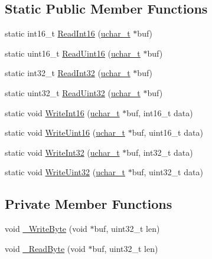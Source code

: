 \subsection*{Static Public Member Functions}
\begin{DoxyCompactItemize}
\item 
static int16\+\_\+t \hyperlink{class_c_byte_stream_a945036d647a836760116bb5797541c5e}{Read\+Int16} (\hyperlink{base_2ostype_8h_a124ea0f8f4a23a0a286b5582137f0b8d}{uchar\+\_\+t} $\ast$buf)
\item 
static uint16\+\_\+t \hyperlink{class_c_byte_stream_a33438bfced8557d24c34b48bb39ad23d}{Read\+Uint16} (\hyperlink{base_2ostype_8h_a124ea0f8f4a23a0a286b5582137f0b8d}{uchar\+\_\+t} $\ast$buf)
\item 
static int32\+\_\+t \hyperlink{class_c_byte_stream_a186365273e46ccaf8c99bd9a570eaa4a}{Read\+Int32} (\hyperlink{base_2ostype_8h_a124ea0f8f4a23a0a286b5582137f0b8d}{uchar\+\_\+t} $\ast$buf)
\item 
static uint32\+\_\+t \hyperlink{class_c_byte_stream_af3f488561191aafe06530146d980d544}{Read\+Uint32} (\hyperlink{base_2ostype_8h_a124ea0f8f4a23a0a286b5582137f0b8d}{uchar\+\_\+t} $\ast$buf)
\item 
static void \hyperlink{class_c_byte_stream_aa72937a9fc75a7ad5d396b14f7f1b5e7}{Write\+Int16} (\hyperlink{base_2ostype_8h_a124ea0f8f4a23a0a286b5582137f0b8d}{uchar\+\_\+t} $\ast$buf, int16\+\_\+t data)
\item 
static void \hyperlink{class_c_byte_stream_a8168cdc0018abb0457fb6177d277471b}{Write\+Uint16} (\hyperlink{base_2ostype_8h_a124ea0f8f4a23a0a286b5582137f0b8d}{uchar\+\_\+t} $\ast$buf, uint16\+\_\+t data)
\item 
static void \hyperlink{class_c_byte_stream_a5e962ee0e33cc661c68ac26076f96e62}{Write\+Int32} (\hyperlink{base_2ostype_8h_a124ea0f8f4a23a0a286b5582137f0b8d}{uchar\+\_\+t} $\ast$buf, int32\+\_\+t data)
\item 
static void \hyperlink{class_c_byte_stream_acfc135062432fa12840f5af47c716d00}{Write\+Uint32} (\hyperlink{base_2ostype_8h_a124ea0f8f4a23a0a286b5582137f0b8d}{uchar\+\_\+t} $\ast$buf, uint32\+\_\+t data)
\end{DoxyCompactItemize}
\subsection*{Private Member Functions}
\begin{DoxyCompactItemize}
\item 
void \hyperlink{class_c_byte_stream_a72aa52b1337916e9a8d626bb7edf4285}{\+\_\+\+Write\+Byte} (void $\ast$buf, uint32\+\_\+t len)
\item 
void \hyperlink{class_c_byte_stream_ab33e1f85cddb394727fbb2afda9e0827}{\+\_\+\+Read\+Byte} (void $\ast$buf, uint32\+\_\+t len)
\end{DoxyCompactItemize}
